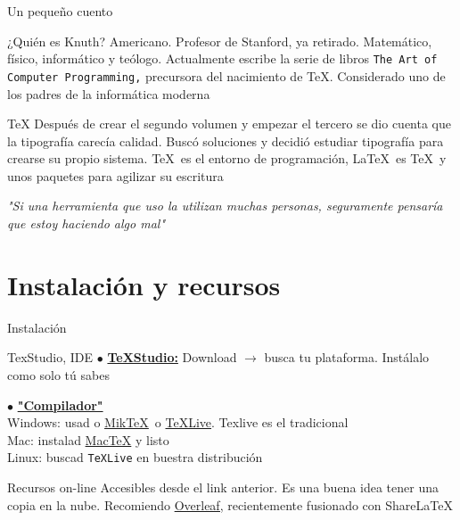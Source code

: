 \documentclass[12pt]{beamer}
\begin{document}
\begin{frame}{Un pequeño cuento}
\small
\begin{block}{¿Quién es Knuth?}
	Americano. Profesor de Stanford, ya retirado. Matemático, físico, informático y teólogo. Actualmente escribe la serie de libros \texttt{The Art of Computer Programming,} precursora del nacimiento de \TeX. Considerado uno de los padres de la informática moderna
\end{block}

\begin{block}{\TeX}
	Después de crear el segundo volumen y empezar el tercero se dio cuenta que la tipografía carecía calidad. Buscó soluciones y decidió estudiar tipografía para crearse su propio sistema. \TeX\ es el entorno de programación, \LaTeX\ es \TeX\ y unos paquetes para agilizar su escritura
\end{block}

	\textit{"Si una herramienta que uso la utilizan muchas personas, seguramente pensaría que estoy haciendo algo mal"}

\end{frame}

\section{Instalación y recursos}

\begin{frame}{Instalación}

\begin{block}{TexStudio, IDE}
	$\bullet$ \href{http://www.texstudio.org/}{\textbf{\TeX Studio:}} Download $\rightarrow$ busca tu plataforma. Instálalo como solo tú sabes
\end{block}

\begin{block}{\LaTeXe}
	$\bullet$ \href{https://www.latex-project.org/get/}{\textbf{"Compilador"}} \\
	Windows: usad o \href{https://miktex.org/}{Mik\TeX}\ o \href{https://tug.org/texlive/acquire-netinstall.html}{\TeX Live}. Texlive es el tradicional\\
	Mac: instalad \href{https://www.tug.org/mactex/}{Mac\TeX} y listo \\
	Linux: buscad \texttt{\TeX Live} en buestra distribución
\end{block}
\begin{block}{Recursos on-line}
	Accesibles desde el link anterior. Es una buena idea tener una copia en la nube. Recomiendo \href{https://www.overleaf.com/}{Overleaf,} recientemente fusionado con Share\LaTeX
\end{block}
\end{frame}
\end{document}
